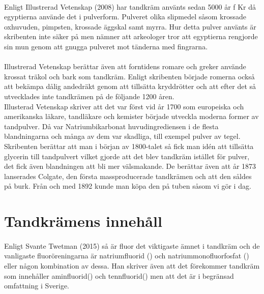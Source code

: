 \documentclass[12pt]{article}
\begin{document}
				\paragraph{}Enligt Illustrerad Vetenskap (2008) har tandkräm använts sedan 5000 år f Kr då egyptierna använde det i pulverform. Pulveret olika slipmedel såsom krossade oxhuvuden, pimpsten, krossade äggskal samt myrra. Hur detta pulver använts är skribenten inte säker på men nämner att arkeologer tror att egyptierna rengjorde sin mun genom att gnugga pulveret mot tänderna med fingrarna.\\
			
			\paragraph{}Illustrerad Vetenskap berättar även att forntidens romare och greker använde krossat träkol och bark som tandkräm. Enligt skribenten började romerna också att bekämpa dålig andedräkt genom att tillsätta kryddrötter och att efter det så utvecklades inte tandkrämen på de följande 1200 åren. \\
			
			Illusterad Vetenskap skriver att det var först vid år 1700 som europeiska och amerikanska läkare, tandläkare och kemister började utveckla moderna former av tandpulver. Då var Natriumbikarbonat huvudingrediensen i de flesta blandningarna och många av dem var skadliga, till exempel pulver av tegel. \\
			
			Skribenten berättar att man i början av 1800-talet så fick man idén att tillsätta glycerin till tandpulvert vilket gjorde att det blev tandkräm istället för pulver, det fick även blandningen att bli mer välsmakande. De berättar även att år 1873 lanserades Colgate, den första massproducerade tandkrämen och att den såldes på burk. Från och med 1892 kunde man köpa den på tuben såsom vi gör i dag.
	
	\section{Tandkrämens innehåll}
		\paragraph{}Enligt Svante Twetman (2015) så är fluor det viktigaste ämnet i tandkräm och de vanligaste fluoröreningarna är natriumfluorid () och natriummonofluorfosfat () eller någon kombination av dessa. Han skriver även att det förekommer tandkräm som innehåller aminfluorid() och tennfluorid() men att det är i begränsad omfattning i Sverige. \\
		
\end{document}
